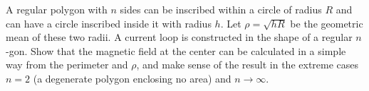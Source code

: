 A regular polygon with $n$ sides can be inscribed within a circle of radius
$R$ and can have a circle 
inscribed inside it with radius $h$. Let $\rho=\sqrt{hR}$ be the geometric mean of these two
radii. A current loop is constructed in the shape of a regular $n$-gon.
Show that the magnetic field at the center can be calculated in a simple way from
the perimeter and $\rho$, and make sense of the result in the extreme cases $n=2$ 
(a degenerate polygon enclosing no area) and $n\rightarrow\infty$.
